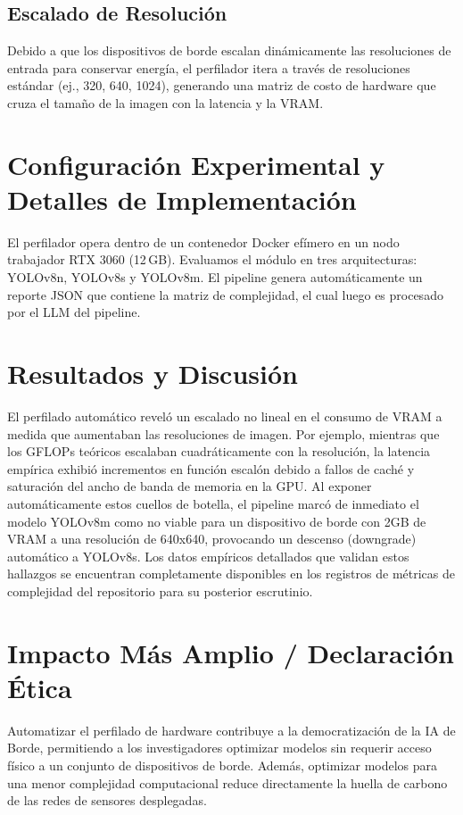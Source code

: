 \documentclass[conference]{IEEEtran}
\begin{document}
\subsection{Escalado de Resolución}
Debido a que los dispositivos de borde escalan dinámicamente las resoluciones de entrada para conservar energía, el perfilador itera a través de resoluciones estándar (ej., 320, 640, 1024), generando una matriz de costo de hardware que cruza el tamaño de la imagen con la latencia y la VRAM.

\section{Configuración Experimental y Detalles de Implementación}
El perfilador opera dentro de un contenedor Docker efímero en un nodo trabajador RTX 3060 (12\,GB). Evaluamos el módulo en tres arquitecturas: YOLOv8n, YOLOv8s y YOLOv8m. El pipeline genera automáticamente un reporte JSON que contiene la matriz de complejidad, el cual luego es procesado por el LLM del pipeline.

\section{Resultados y Discusión}
El perfilado automático reveló un escalado no lineal en el consumo de VRAM a medida que aumentaban las resoluciones de imagen. Por ejemplo, mientras que los GFLOPs teóricos escalaban cuadráticamente con la resolución, la latencia empírica exhibió incrementos en función escalón debido a fallos de caché y saturación del ancho de banda de memoria en la GPU. Al exponer automáticamente estos cuellos de botella, el pipeline marcó de inmediato el modelo YOLOv8m como no viable para un dispositivo de borde con 2GB de VRAM a una resolución de 640x640, provocando un descenso (downgrade) automático a YOLOv8s. Los datos empíricos detallados que validan estos hallazgos se encuentran completamente disponibles en los registros de métricas de complejidad del repositorio para su posterior escrutinio.

\section{Impacto Más Amplio / Declaración Ética}
Automatizar el perfilado de hardware contribuye a la democratización de la IA de Borde, permitiendo a los investigadores optimizar modelos sin requerir acceso físico a un conjunto de dispositivos de borde. Además, optimizar modelos para una menor complejidad computacional reduce directamente la huella de carbono de las redes de sensores desplegadas.
\end{document}
